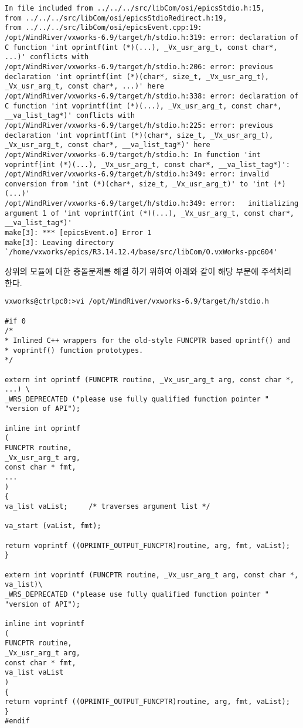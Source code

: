 \documentclass[11pt
  , a4paper
  , article
  , oneside
]{memoir}
\begin{document}
\begin{lstlisting}[style=termstyle]
In file included from ../../../src/libCom/osi/epicsStdio.h:15,
from ../../../src/libCom/osi/epicsStdioRedirect.h:19,
from ../../../src/libCom/osi/epicsEvent.cpp:19:
/opt/WindRiver/vxworks-6.9/target/h/stdio.h:319: error: declaration of C function 'int oprintf(int (*)(...), _Vx_usr_arg_t, const char*, ...)' conflicts with
/opt/WindRiver/vxworks-6.9/target/h/stdio.h:206: error: previous declaration 'int oprintf(int (*)(char*, size_t, _Vx_usr_arg_t), _Vx_usr_arg_t, const char*, ...)' here
/opt/WindRiver/vxworks-6.9/target/h/stdio.h:338: error: declaration of C function 'int voprintf(int (*)(...), _Vx_usr_arg_t, const char*, __va_list_tag*)' conflicts with
/opt/WindRiver/vxworks-6.9/target/h/stdio.h:225: error: previous declaration 'int voprintf(int (*)(char*, size_t, _Vx_usr_arg_t), _Vx_usr_arg_t, const char*, __va_list_tag*)' here
/opt/WindRiver/vxworks-6.9/target/h/stdio.h: In function 'int voprintf(int (*)(...), _Vx_usr_arg_t, const char*, __va_list_tag*)':
/opt/WindRiver/vxworks-6.9/target/h/stdio.h:349: error: invalid conversion from 'int (*)(char*, size_t, _Vx_usr_arg_t)' to 'int (*)(...)'
/opt/WindRiver/vxworks-6.9/target/h/stdio.h:349: error:   initializing argument 1 of 'int voprintf(int (*)(...), _Vx_usr_arg_t, const char*, __va_list_tag*)'
make[3]: *** [epicsEvent.o] Error 1
make[3]: Leaving directory `/home/vxworks/epics/R3.14.12.4/base/src/libCom/O.vxWorks-ppc604'
\end{lstlisting}

상위의 모듈에 대한 충돌문제를 해결 하기 위하여 아래와 같이 해당 부분에 주석처리 한다.
\begin{lstlisting}[style=termstyle]
vxworks@ctrlpc0:>vi /opt/WindRiver/vxworks-6.9/target/h/stdio.h

#if 0
/*
* Inlined C++ wrappers for the old-style FUNCPTR based oprintf() and
* voprintf() function prototypes.
*/

extern int oprintf (FUNCPTR routine, _Vx_usr_arg_t arg, const char *, ...) \
_WRS_DEPRECATED ("please use fully qualified function pointer "
"version of API");

inline int oprintf
(
FUNCPTR routine,
_Vx_usr_arg_t arg,
const char * fmt,
...
)
{
va_list vaList;     /* traverses argument list */

va_start (vaList, fmt);

return voprintf ((OPRINTF_OUTPUT_FUNCPTR)routine, arg, fmt, vaList);
}

extern int voprintf (FUNCPTR routine, _Vx_usr_arg_t arg, const char *, va_list)\
_WRS_DEPRECATED ("please use fully qualified function pointer "
"version of API");

inline int voprintf
(
FUNCPTR routine,
_Vx_usr_arg_t arg,
const char * fmt,
va_list vaList
)
{
return voprintf ((OPRINTF_OUTPUT_FUNCPTR)routine, arg, fmt, vaList);
}
#endif

\end{lstlisting}
 
\end{document}
